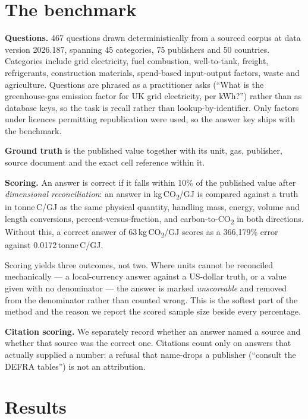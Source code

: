 \documentclass[10pt,a4paper]{article}
\begin{document}
\vspace{-0.3em}
\section{The benchmark}

\textbf{Questions.} 467 questions drawn deterministically from a sourced corpus at data version 2026.187, spanning 45 categories, 75 publishers and 50 countries. Categories include grid electricity, fuel combustion, well-to-tank, freight, refrigerants, construction materials, spend-based input-output factors, waste and agriculture. Questions are phrased as a practitioner asks (``What is the greenhouse-gas emission factor for UK grid electricity, per kWh?'') rather than as database keys, so the task is recall rather than lookup-by-identifier. Only factors under licences permitting republication were used, so the answer key ships with the benchmark.

\textbf{Ground truth} is the published value together with its unit, gas, publisher, source document and the exact cell reference within it.

\textbf{Scoring.} An answer is correct if it falls within 10\% of the published value after \emph{dimensional reconciliation}: an answer in kg\,CO\textsubscript{2}/GJ is compared against a truth in tonne\,C/GJ as the same physical quantity, handling mass, energy, volume and length conversions, percent-versus-fraction, and carbon-to-CO\textsubscript{2} in both directions. Without this, a correct answer of 63\,kg\,CO\textsubscript{2}/GJ scores as a 366{,}179\% error against 0.0172\,tonne\,C/GJ.

Scoring yields three outcomes, not two. Where units cannot be reconciled mechanically --- a local-currency answer against a US-dollar truth, or a value given with no denominator --- the answer is marked \emph{unscoreable} and removed from the denominator rather than counted wrong. This is the softest part of the method and the reason we report the scored sample size beside every percentage.

\textbf{Citation scoring.} We separately record whether an answer named a source and whether that source was the correct one. Citations count only on answers that actually supplied a number: a refusal that name-drops a publisher (``consult the DEFRA tables'') is not an attribution.

\vspace{-0.3em}
\section{Results}
\end{document}

